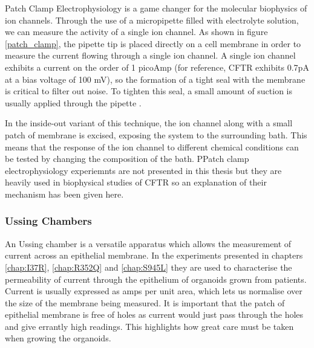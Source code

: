 Patch Clamp Electrophysiology is a game changer for the molecular biophysics of ion channels. Through the use of a micropipette filled with electrolyte solution, we can measure the activity of a single ion channel. As shown in figure \ref{patch_clamp}, the pipette tip is placed directly on a cell membrane in order to measure the current flowing through a single ion channel. A single ion channel exhibits a current on the order of 1 picoAmp (for reference, CFTR exhibits 0.7pA at a bias voltage of 100 mV), so the formation of a tight seal with the membrane is critical to filter out noise. To tighten this seal, a small amount of suction is usually applied through the pipette \cite{aidley1996}.

In the inside-out variant of this technique, the ion channel along with a small patch of membrane is excised, exposing the system to the surrounding bath. This means that the response of the ion channel to different chemical conditions can be tested by changing the composition of the bath. PPatch clamp electrophysiology experiemnts are not presented in this thesis but they are heavily used in biophysical studies of CFTR so an explanation of their mechanism has been given here.

\subsubsection{Ussing Chambers}
An Ussing chamber is a versatile apparatus which allows the measurement of current across an epithelial membrane. In the experiments presented in chapters \ref{chap:I37R}, \ref{chap:R352Q} and \ref{chap:S945L} they are used to characterise the permeability of current through the epithelium of organoids grown from patients. Current is usually expressed as amps per unit area, which lets us normalise over the size of the membrane being measured. It is important that the patch of epithelial membrane is free of holes as current would just pass through the holes and give errantly high readings. This highlights how great care must be taken when growing the organoids.

